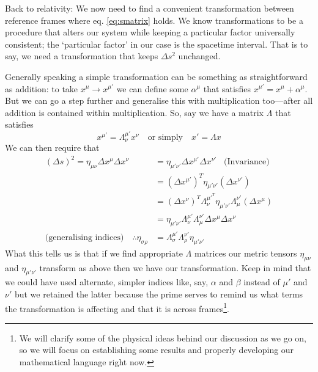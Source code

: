 \documentclass[english,seminar]{lecture}
\begin{document}
Back to relativity: We now need to find a convenient transformation between reference frames where eq. \eqref{eq:smatrix} holds. We know transformations to be a procedure that alters our system while keeping a particular factor universally consistent; the `particular factor' in our case is the spacetime interval. That is to say, we need a transformation that keeps $\Delta s^2$ unchanged.

Generally speaking a simple transformation can be something as straightforward as addition: to take $x^\mu \rightarrow x^{\mu '}$ we can define some $\alpha^\mu$ that satisfies $x^{\mu '} = x^\mu + \alpha^\mu$. But we can go a step further and generalise this with multiplication too---after all addition is contained within multiplication. So, say we have a matrix $\Lambda$ that satisfies
\begin{equation}
x^{\mu '} = \Lambda^{\mu '}_\nu x^\nu \quad \textrm{or simply} \quad x' = \Lambda x \label{eq:LambdaTransformation}
\end{equation}%
We can then require that
\begin{align}
	(\Delta s)^2 = \eta_{\mu\nu} \Delta x^{\mu } \Delta x^{\nu }
		&= \eta_{\mu'\nu'} \Delta x^{\mu '} \Delta x^{\nu '} \;\;\;\textrm{(Invariance)} \nonumber\\
		&= \left( \Delta x^{\mu '} \right)^T \eta_{\mu'\nu'} \left( \Delta x^{\nu '} \right) \nonumber\\
		&= \left( \Delta x^\nu \right)^T \Lambda^{\mu'^T}_\nu \eta_{\mu'\nu'} \Lambda^{\nu'}_\mu \left( \Delta x^\mu \right) \nonumber\\
		&= \eta_{\mu'\nu'} \Lambda^{\mu'}_\nu \Lambda^{\nu'}_\mu \Delta x^\mu \Delta x^\nu \nonumber\\
\textrm{(generalising indices)} \quad \therefore \eta_{\sigma\rho} &= \Lambda^{\mu'}_\sigma \Lambda^{\nu'}_\rho \eta_{\mu'\nu'} \label{eq:lorentzCondition}
\end{align}%
What this tells us is that if we find appropriate $\Lambda$ matrices our metric tensors $\eta_{\mu\nu}$ and $\eta_{\mu '\nu '}$ transform as above then we have our transformation. Keep in mind that we could have used alternate, simpler indices like, say, $\alpha$ and $\beta$ instead of $\mu '$ and $\nu '$ but we retained the latter because the prime serves to remind us what terms the transformation is affecting and that it is across frames\footnote{We will clarify some of the physical ideas behind our discussion as we go on, so we will focus on establishing some results and properly developing our mathematical language right now.}.
\end{document}
